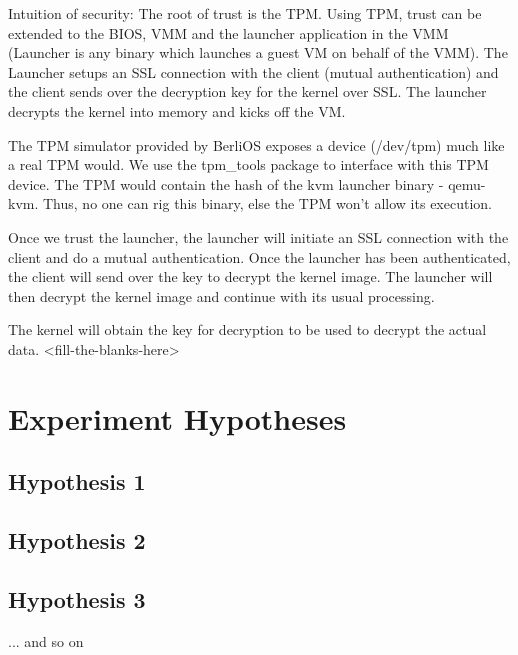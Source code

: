 \documentclass[11pt,pdftex]{article}
\begin{document}
Intuition of security:
The root of trust is the TPM. Using TPM, trust can be extended to the BIOS, VMM and the launcher application in the VMM (Launcher is any binary which launches a guest VM on behalf of the VMM). The Launcher setups an SSL connection with the client (mutual authentication) and the client sends over the decryption key for the kernel over SSL. The launcher decrypts the kernel into memory and kicks off the VM. 


The TPM simulator provided by BerliOS exposes a device (/dev/tpm) much like a real TPM would. We use the tpm\_tools package to interface with this TPM device. The TPM would contain the hash of the kvm launcher binary - qemu-kvm. Thus, no one can rig this binary, else the TPM won't allow its execution. 

Once we trust the launcher, the launcher will initiate an SSL connection with the client and do a mutual authentication. Once the launcher has been authenticated, the client will send over the key to decrypt the kernel image. The launcher will then decrypt the kernel image and continue with its usual processing.

The kernel will obtain the key for decryption to be used to decrypt the actual data. <fill-the-blanks-here>

\section{Experiment Hypotheses}

\subsection{Hypothesis 1}
\subsection{Hypothesis 2}
\subsection{Hypothesis 3}
... and so on
\end{document}
